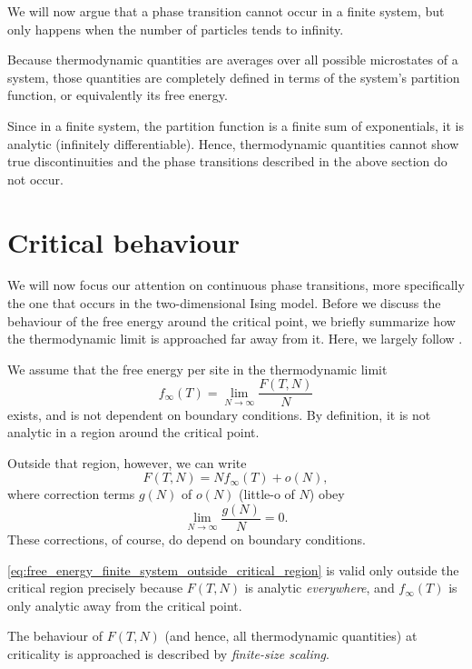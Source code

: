 We will now argue that a phase transition cannot occur in a finite system,
but only happens when the number of particles tends to infinity.

Because thermodynamic quantities are averages over all possible
microstates of a system, those quantities are completely defined in terms
of the system's partition function, or equivalently its free energy.

Since in a finite system, the partition function is a finite sum of
exponentials, it is analytic (infinitely differentiable). Hence, thermodynamic
quantities cannot show true discontinuities and the phase transitions
described in the above section do not occur.

\section{Critical behaviour}
We will now focus our attention on continuous phase transitions, more specifically the one that occurs in the
two-dimensional Ising model.
Before we discuss the behaviour of the free energy around the critical point,
we briefly summarize how the thermodynamic limit is approached far away from it.
Here, we largely follow \cite{barber1983finite}.

We assume that the free energy per site in the thermodynamic limit
\begin{equation}
  f_{\infty}(T) = \lim_{N \to \infty} \frac{F(T, N)}{N}
\end{equation}
exists, and is not dependent on boundary conditions.
By definition, it is not analytic in a region around the critical point.

Outside that region, however, we can write
\begin{equation}\label{eq:free_energy_finite_system_outside_critical_region}
  F(T, N) = N f_{\infty}(T) + o(N),
\end{equation}
where correction terms $g(N)$ of $o(N)$ (little-o of $N$) obey
\begin{equation}
  \lim_{N \to \infty} \frac{g(N)}{N} = 0.
\end{equation}
These corrections, of course, do depend on boundary conditions.

\autoref{eq:free_energy_finite_system_outside_critical_region} is valid only outside the critical region precisely
because $F(T, N)$ is analytic \emph{everywhere}, and $f_{\infty}(T)$ is only analytic away from the critical point.

The behaviour of $F(T, N)$ (and hence, all thermodynamic quantities) at criticality is approached is described by
\emph{finite-size scaling}.

